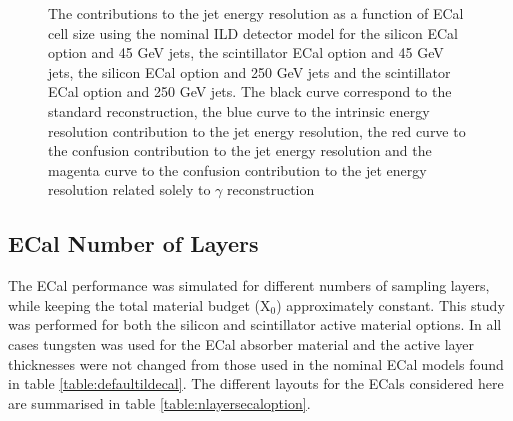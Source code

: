 \begin{figure}
\caption[The contributions to the jet energy resolution as a function of ECal cell size using the nominal ILD detector model for \protect{} the silicon ECal option and 45 GeV jets, \protect{} the scintillator ECal option and 45 GeV jets, \protect{} the silicon ECal option and 250 GeV jets and \protect{} the scintillator ECal option and 250 GeV jets.  The black curve correspond to the standard reconstruction, the blue curve to the intrinsic energy resolution contribution to the jet energy resolution, the red curve to the confusion contribution to the jet energy resolution and the magenta curve to the confusion contribution to the jet energy resolution related solely to $\gamma$ reconstruction.]{The contributions to the jet energy resolution as a function of ECal cell size using the nominal ILD detector model for \protect{} the silicon ECal option and 45 GeV jets, \protect{} the scintillator ECal option and 45 GeV jets, \protect{} the silicon ECal option and 250 GeV jets and \protect{} the scintillator ECal option and 250 GeV jets.  The black curve correspond to the standard reconstruction, the blue curve to the intrinsic energy resolution contribution to the jet energy resolution, the red curve to the confusion contribution to the jet energy resolution and the magenta curve to the confusion contribution to the jet energy resolution related solely to $\gamma$ reconstruction}
\label{fig:ecalcellsizebreak}
\end{figure}


\subsection{ECal Number of Layers}
\label{sec:ecalnlayers}
The ECal performance was simulated for different numbers of sampling layers, while keeping the total material budget ($\text{X}_{0}$) approximately constant.  This study was performed for both the silicon and scintillator active material options.  In all cases tungsten was used for the ECal absorber material and the active layer thicknesses were not changed from those used in the nominal ECal models found in table \ref{table:defaultildecal}.  The different layouts for the ECals considered here are summarised in table \ref{table:nlayersecaloption}.  

